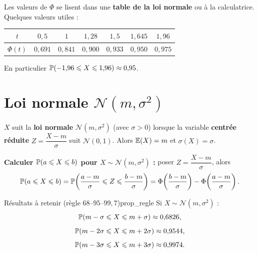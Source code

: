 \begin{astucebac}
	Les valeurs de $\Phi$ se lisent dans une \textbf{table de la loi normale}
	ou à la calculatrice. Quelques valeurs utiles :
	\begin{center}
	\begin{tabular}{|c|c|c|c|c|c|c|}
		\hline
		$t$ & $0{,}5$ & $1$ & $1{,}28$ & $1{,}5$ & $1{,}645$ & $1{,}96$ \\
		\hline
		$\Phi(t)$ & $0{,}691$ & $0{,}841$ & $0{,}900$ & $0{,}933$ &
		$0{,}950$ & $0{,}975$ \\
		\hline
	\end{tabular}
	\end{center}
	En particulier $\mathbb{P}(-1{,}96\leqslant X\leqslant 1{,}96)\approx 0{,}95$.
\end{astucebac}


\section{Loi normale \texorpdfstring{$\mathscr{N}(m,\sigma^2)$}{N(m,sigma carre)}}

\begin{definition}
	$X$ suit la \textbf{loi normale} $\mathscr{N}(m,\sigma^2)$ (avec
	$\sigma>0$) lorsque la variable \textbf{centrée réduite}
	$Z = \dfrac{X-m}{\sigma}$ suit $\mathscr{N}(0,1)$. Alors $\mathbb{E}(X)=m$ et
	$\sigma(X)=\sigma$.
\end{definition}

\begin{methode}
	\textbf{Calculer $\mathbb{P}(a\leqslant X\leqslant b)$ pour
	$X\sim\mathscr{N}(m,\sigma^2)$ :} poser $Z=\dfrac{X-m}{\sigma}$, alors
	\[
	\mathbb{P}(a\leqslant X\leqslant b)
	= \mathbb{P}\!\left(\frac{a-m}{\sigma}\leqslant Z\leqslant\frac{b-m}{\sigma}\right)
	= \Phi\!\left(\frac{b-m}{\sigma}\right) - \Phi\!\left(\frac{a-m}{\sigma}\right).
	\]
\end{methode}

\begin{propriete}{Résultats à retenir (règle $68$–$95$–$99{,}7$)}{prop_regle}
	Si $X\sim\mathscr{N}(m,\sigma^2)$ :
	\[
	\mathbb{P}(m-\sigma\leqslant X\leqslant m+\sigma) \approx 0{,}6826,
	\]
	\[
	\mathbb{P}(m-2\sigma\leqslant X\leqslant m+2\sigma) \approx 0{,}9544,
	\]
	\[
	\mathbb{P}(m-3\sigma\leqslant X\leqslant m+3\sigma) \approx 0{,}9974.
	\]
\end{propriete}


